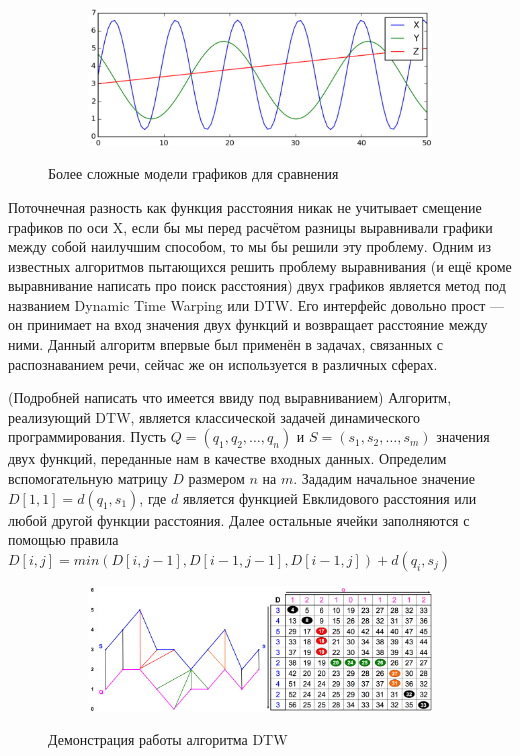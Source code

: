 \begin{figure}[ht]
	\centering
    \begin{subfigure}[b]{1\textwidth}
    \centering
        \includegraphics[scale=0.45]{pasted-image-39.png}        
    \end{subfigure}
 
    \caption{Более сложные модели графиков для сравнения}
    \label{fig_parsetree}
\end{figure}

Поточнечная разность как функция расстояния никак не учитывает смещение графиков по оси X, если бы мы перед расчётом разницы выравнивали графики между собой наилучшим способом, то мы бы решили эту проблему. Одним из известных алгоритмов пытающихся решить проблему выравнивания (и ещё кроме выравнивание написать про поиск расстояния) двух графиков является метод под названием Dynamic Time Warping или DTW. Его интерфейс довольно прост — он принимает на вход значения двух функций и возвращает расстояние между ними. Данный алгоритм впервые был применён в задачах, связанных с распознаванием речи, сейчас же он используется в различных сферах.

(Подробней написать что имеется ввиду под выравниванием) Алгоритм, реализующий DTW, является классической задачей динамического программирования. Пусть  $Q = \left( q_1, q_2, \dots, q_n \right)$ и $S = \left( s_1, s_2, \dots, s_m \right)$ значения двух функций, переданные нам в качестве входных данных. Определим вспомогательную матрицу $D$ размером $n$ на $m$. Зададим начальное значение $D[1, 1] = d(q_1, s_1)$, где $d$ является функцией Евклидового расстояния или любой другой функции расстояния. Далее остальные ячейки заполняются с помощью правила $D[i, j] = min(D[i, j - 1], D[i - 1, j - 1], D[i - 1, j]) + d(q_i, s_j)$

\begin{figure}[ht]
	\centering
    \begin{subfigure}[b]{1\textwidth}
    \centering
        \includegraphics[scale=0.40]{pasted-image-41.png}        
    \end{subfigure}
 
    \caption{Демонстрация работы алгоритма DTW}
    \label{fig_parsetree}
\end{figure}

